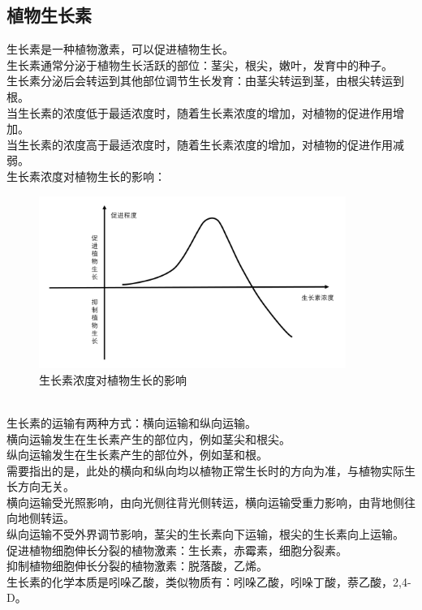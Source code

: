 \documentclass[UTF8]{ctexart}
\begin{document}
\newpage

\subsection{植物生长素}
    生长素是一种植物激素，可以促进植物生长。\\[3mm]
    生长素通常分泌于植物生长活跃的部位：茎尖，根尖，嫩叶，发育中的种子。\\[3mm]
    生长素分泌后会转运到其他部位调节生长发育：由茎尖转运到茎，由根尖转运到根。\\[6mm]
    当生长素的浓度低于最适浓度时，随着生长素浓度的增加，对植物的促进作用增加。\\[3mm]
    当生长素的浓度高于最适浓度时，随着生长素浓度的增加，对植物的促进作用减弱。\\[6mm]
    生长素浓度对植物生长的影响：
    \begin{figure}[h]
        \begin{center}
            \includegraphics[width=10cm]{BiologyImage/16.jpg}
            \caption{生长素浓度对植物生长的影响}
        \end{center}
    \end{figure}\\
    生长素的运输有两种方式：横向运输和纵向运输。\\[3mm]
    横向运输发生在生长素产生的部位内，例如茎尖和根尖。\\[3mm]
    纵向运输发生在生长素产生的部位外，例如茎和根。\\[3mm]
    需要指出的是，此处的横向和纵向均以植物正常生长时的方向为准，与植物实际生长方向无关。\\[6mm]
    横向运输受光照影响，由向光侧往背光侧转运，横向运输受重力影响，由背地侧往向地侧转运。\\[3mm]
    纵向运输不受外界调节影响，茎尖的生长素向下运输，根尖的生长素向上运输。\\[6mm]
    促进植物细胞伸长分裂的植物激素：生长素，赤霉素，细胞分裂素。\\[3mm]
    抑制植物细胞伸长分裂的植物激素：脱落酸，乙烯。\\[3mm]
    生长素的化学本质是吲哚乙酸，类似物质有：吲哚乙酸，吲哚丁酸，萘乙酸，2,4-D。
\end{document}
